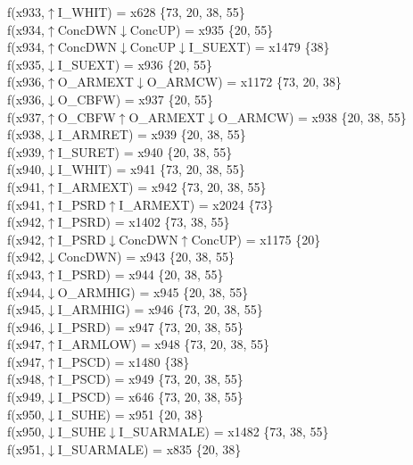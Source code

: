f(x933,$\uparrow$I\_WHIT) = x628 \{73, 20, 38, 55\} \\  
f(x934,$\uparrow$ConcDWN$\downarrow$ConcUP) = x935 \{20, 55\} \\  
f(x934,$\uparrow$ConcDWN$\downarrow$ConcUP$\downarrow$I\_SUEXT) = x1479 \{38\} \\  
f(x935,$\downarrow$I\_SUEXT) = x936 \{20, 55\} \\  
f(x936,$\uparrow$O\_ARMEXT$\downarrow$O\_ARMCW) = x1172 \{73, 20, 38\} \\  
f(x936,$\downarrow$O\_CBFW) = x937 \{20, 55\} \\  
f(x937,$\uparrow$O\_CBFW$\uparrow$O\_ARMEXT$\downarrow$O\_ARMCW) = x938 \{20, 38, 55\} \\  
f(x938,$\downarrow$I\_ARMRET) = x939 \{20, 38, 55\} \\  
f(x939,$\uparrow$I\_SURET) = x940 \{20, 38, 55\} \\  
f(x940,$\downarrow$I\_WHIT) = x941 \{73, 20, 38, 55\} \\  
f(x941,$\uparrow$I\_ARMEXT) = x942 \{73, 20, 38, 55\} \\  
f(x941,$\uparrow$I\_PSRD$\uparrow$I\_ARMEXT) = x2024 \{73\} \\  
f(x942,$\uparrow$I\_PSRD) = x1402 \{73, 38, 55\} \\  
f(x942,$\uparrow$I\_PSRD$\downarrow$ConcDWN$\uparrow$ConcUP) = x1175 \{20\} \\  
f(x942,$\downarrow$ConcDWN) = x943 \{20, 38, 55\} \\  
f(x943,$\uparrow$I\_PSRD) = x944 \{20, 38, 55\} \\  
f(x944,$\downarrow$O\_ARMHIG) = x945 \{20, 38, 55\} \\  
f(x945,$\downarrow$I\_ARMHIG) = x946 \{73, 20, 38, 55\} \\  
f(x946,$\downarrow$I\_PSRD) = x947 \{73, 20, 38, 55\} \\  
f(x947,$\uparrow$I\_ARMLOW) = x948 \{73, 20, 38, 55\} \\  
f(x947,$\uparrow$I\_PSCD) = x1480 \{38\} \\  
f(x948,$\uparrow$I\_PSCD) = x949 \{73, 20, 38, 55\} \\  
f(x949,$\downarrow$I\_PSCD) = x646 \{73, 20, 38, 55\} \\  
f(x950,$\downarrow$I\_SUHE) = x951 \{20, 38\} \\  
f(x950,$\downarrow$I\_SUHE$\downarrow$I\_SUARMALE) = x1482 \{73, 38, 55\} \\  
f(x951,$\downarrow$I\_SUARMALE) = x835 \{20, 38\} \\  
